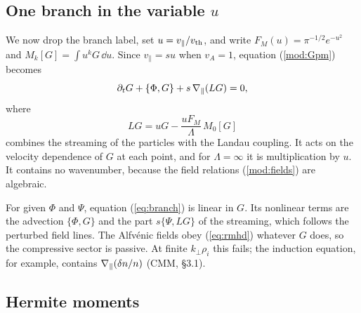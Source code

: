 \subsection{One branch in the variable \texorpdfstring{$u$}{u}}\label{mod:onebranch}

We now drop the branch label, set $u=v_\parallel/v_{\mathrm{th}}$, and write $F_M(u)=\pi^{-1/2}e^{-u^2}$ and $M_k[G]=\int u^kG\,\dd u$. Since $v_\parallel=su$ when $v_A=1$, equation (\ref{mod:Gpm}) becomes
\begin{equation}\label{eq:branch}
  \partial_tG+\{\Phi,G\}+s\,\nabla_\parallel(LG)=0,
\end{equation}
where
\begin{equation}\label{eq:L}
  LG=uG-\frac{uF_M}{\Lambda}\,M_0[G]
\end{equation}
combines the streaming of the particles with the Landau coupling. It acts on the velocity dependence of $G$ at each point, and for $\Lambda=\infty$ it is multiplication by $u$. It contains no wavenumber, because the field relations (\ref{mod:fields}) are algebraic.

For given $\Phi$ and $\Psi$, equation (\ref{eq:branch}) is linear in $G$. Its nonlinear terms are the advection $\{\Phi,G\}$ and the part $s\{\Psi,LG\}$ of the streaming, which follows the perturbed field lines. The Alfv\'enic fields obey (\ref{eq:rmhd}) whatever $G$ does, so the compressive sector is passive. At finite $k_\perp\rho_i$ this fails; the induction equation, for example, contains $\nabla_\parallel(\delta n/n)$ (CMM, \S3.1).

\subsection{Hermite moments}\label{mod:hermite}

